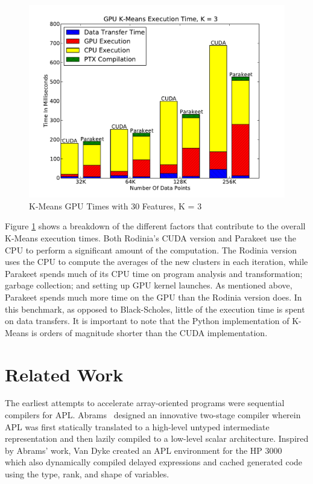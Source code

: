 \documentclass[10pt,twocolumn]{article}
\begin{document}
\begin{figure}
\includegraphics[scale=0.4]{KMGPU.pdf}
\caption{K-Means GPU Times with 30 Features, K = 3}
\label{KMGPU}
\end{figure}

Figure \ref{KMGPU} shows a breakdown of the different factors that contribute to the overall K-Means execution times.  Both Rodinia's CUDA version and Parakeet use the CPU to perform a significant amount of the computation.  The Rodinia version uses the CPU to compute the averages of the new clusters in each iteration, while Parakeet spends much of its CPU time on program analysis and transformation; garbage collection; and setting up GPU kernel launches.  As mentioned above, Parakeet spends much more time on the GPU than the Rodinia version does. In this benchmark, as opposed to Black-Scholes, little of the execution time is spent on data transfers.  It is important to note that the Python implementation of K-Means is orders of magnitude shorter than the CUDA implementation.

\section{Related Work}
\label{RelatedWork}
The earliest attempts to accelerate array-oriented programs were sequential compilers for APL. Abrams~\cite{Abrams70} designed an innovative two-stage compiler wherein APL was first statically translated to a high-level untyped intermediate representation and then lazily compiled to a low-level scalar architecture. Inspired by Abrams' work, Van Dyke created an APL environment for the HP 3000~\cite{VanDyke77} which also dynamically compiled delayed expressions and cached generated code using the type, rank, and shape of variables. 
\end{document}
